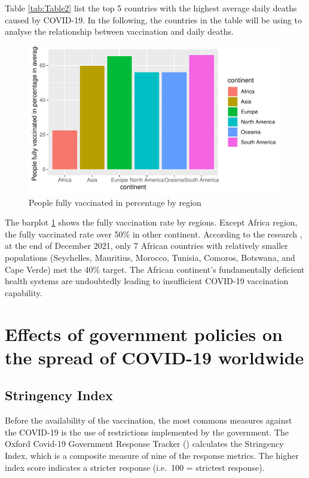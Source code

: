 \documentclass[11pt,a4paper,]{article}
\begin{document}
Table \ref{tab:Table2} list the top 5 countries with the highest average daily deaths caused by COVID-19.
In the following, the countries in the table will be using to analyse the relationship between vaccination and daily deaths.

\begin{figure}

{\centering \includegraphics{report_files/figure-latex/Figure3-1} 

}

\caption{People fully vaccinated in percentage by region}\label{fig:Figure3}
\end{figure}

The barplot \ref{fig:Figure3} shows the fully vaccination rate by regions. Except Africa region, the fully vaccinated rate over 50\% in other continent. According to the research \textcite{African-COVID-19-vaccination}, at the end of December 2021, only 7 African countries with relatively smaller populations (Seychelles, Mauritius, Morocco, Tunisia, Comoros, Botswana, and Cape Verde) met the 40\% target. The African continent's fundamentally deficient health systems are undoubtedly leading to insufficient COVID-19 vaccination capability.

\clearpage

\section*{Effects of government policies on the spread of COVID-19 worldwide}

\subsection*{Stringency Index}

Before the availability of the vaccination, the most commons measures against the COVID-19 is the use of restrictions implemented by the government. The Oxford Covid-19 Government Response Tracker (\textcite{OxCGRT}) calculates the Stringency Index, which is a composite measure of nine of the response metrics. The higher index score indicates a stricter response (i.e.~100 = strictest response).
\end{document}
